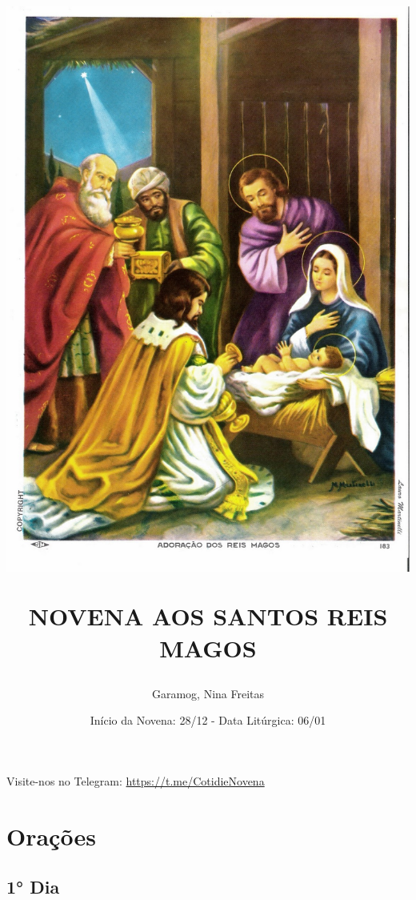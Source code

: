 \documentclass[18pt]{article}
\title{
 \includegraphics[scale=0.25, trim={10cm, 0, 10cm, 0}]{./assets/imagem.jpg}
  \par
   NOVENA AOS SANTOS REIS MAGOS}
\author{Garamog, Nina Freitas}
\date{Início da Novena: 28/12 - Data Litúrgica: 06/01 }
\begin{document}
\maketitle

\thispagestyle{empty} %


\pagestyle{fancy}
\fancyhf{} %
\fancyfoot[R]{\thepage}

\newpage

\tableofcontents

\centering
\vfill
Visite-nos no Telegram: \url{https://t.me/CotidieNovena}
\newpage

\newpage


\section{Orações}\label{sec:Orações} %

\subsection{1° Dia}
\end{document}
